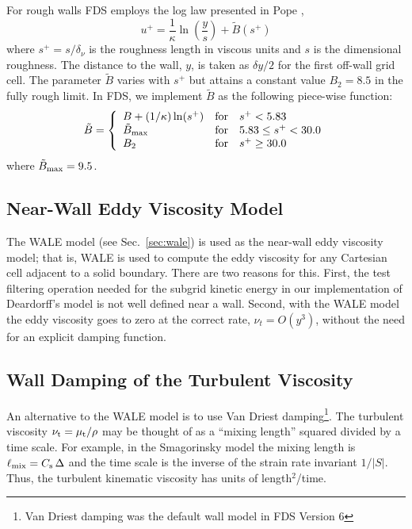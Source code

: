 For rough walls FDS employs the log law presented in Pope \cite{Pope:2000},
\begin{equation}
\label{eqn_roughwallloglaw}
u^+ = \frac{1}{\kappa} \ln \left(\frac{y}{s}\right) + \tilde{B}(s^+)
\end{equation}
where $s^+ = s/\delta_\nu$ is the roughness length in viscous units and $s$ is the dimensional roughness. The distance to the wall, $y$, is taken as $\delta y/2$ for the first off-wall grid cell.  The parameter $\tilde{B}$ varies with $s^+$ but attains a constant value $B_2=8.5$ in the fully rough limit.  In FDS, we implement $\tilde{B}$ as the following piece-wise function:
\begin{equation}
\tilde{B} = \left\{ \begin{array}{lll} B + (1/\kappa)\ln(s^+)  & \mbox{for} &          s^+ < 5.83 \\
                                       \tilde{B}_{\rm max}     & \mbox{for} & 5.83 \le s^+ < 30.0 \\
                                       B_2                     & \mbox{for} &          s^+ \ge 30.0 \end{array} \right.
\end{equation}
where $\tilde{B}_{\rm max} = 9.5$.


\subsection{Near-Wall Eddy Viscosity Model}
\label{sec:wall_wale_model}

The WALE model (see Sec.~\ref{sec:wale}) is used as the near-wall eddy viscosity model; that is, WALE is used to compute the eddy viscosity for any Cartesian cell adjacent to a solid boundary.  There are two reasons for this.  First, the test filtering operation needed for the subgrid kinetic energy in our implementation of Deardorff's model is not well defined near a wall.  Second, with the WALE model the eddy viscosity goes to zero at the correct rate, $\nu_t = O(y^3)$, without the need for an explicit damping function.

\subsection{Wall Damping of the Turbulent Viscosity}
\label{sec:wall_damping}

An alternative to the WALE model is to use Van Driest damping\footnote{Van Driest damping was the default wall model in FDS Version 6}. The turbulent viscosity $\nu_{\rm t} = \mu_{\rm t}/\rho$ may be thought of as a ``mixing length'' squared divided by a time scale.  For example, in the Smagorinsky model the mixing length is $\ell_{\rm mix} = C_{\rm s} \,\Delta$ and the time scale is the inverse of the strain rate invariant $1/|S|$.  Thus, the turbulent kinematic viscosity has units of length$^2$/time.

